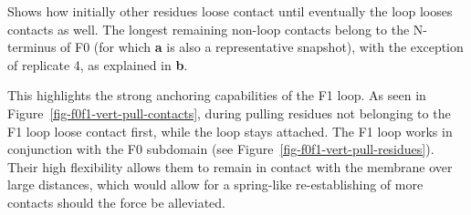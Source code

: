 \documentclass[
  twocolumn]{biophys-new-mod}
\begin{document}
Shows how initially other residues loose contact until eventually the
loop looses contacts as well. The longest remaining non-loop contacts
belong to the N-terminus of F0 (for which \textbf{a} is also a
representative snapshot), with the exception of replicate 4, as
explained in \textbf{b}.

This highlights the strong anchoring capabilities of the F1 loop. As
seen in Figure~\ref{fig-f0f1-vert-pull-contacts}, during pulling
residues not belonging to the F1 loop loose contact first, while the
loop stays attached. The F1 loop works in conjunction with the F0
subdomain (see Figure~\ref{fig-f0f1-vert-pull-residues}). Their high
flexibility allows them to remain in contact with the membrane over
large distances, which would allow for a spring-like re-establishing of
more contacts should the force be alleviated.
\end{document}
